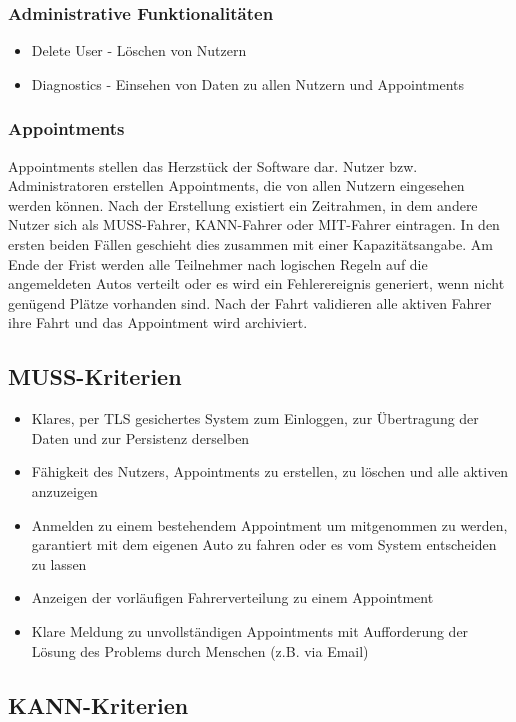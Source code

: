\documentclass[11pt,a4paper]{article}
\begin{document}
\subsubsection{Administrative Funktionalitäten}
\begin{itemize}
\item Delete User - Löschen von Nutzern
\item Diagnostics - Einsehen von Daten zu allen Nutzern und Appointments
\end{itemize}
\subsubsection{Appointments}
Appointments stellen das Herzstück der Software dar. Nutzer bzw. Administratoren erstellen Appointments, die von allen Nutzern eingesehen werden können. Nach der Erstellung existiert ein Zeitrahmen, in dem andere Nutzer sich als MUSS-Fahrer, KANN-Fahrer oder MIT-Fahrer eintragen. In den ersten beiden Fällen geschieht dies zusammen mit einer Kapazitätsangabe.
Am Ende der Frist werden alle Teilnehmer nach logischen Regeln auf die angemeldeten Autos verteilt oder es wird ein Fehlerereignis generiert, wenn nicht genügend Plätze vorhanden sind.
Nach der Fahrt validieren alle aktiven Fahrer ihre Fahrt und das Appointment wird archiviert.
\subsection{MUSS-Kriterien}
\begin{itemize}
\item Klares, per TLS gesichertes System zum Einloggen, zur Übertragung der Daten und zur Persistenz derselben
\item Fähigkeit des Nutzers, Appointments zu erstellen, zu löschen und alle aktiven anzuzeigen
\item Anmelden zu einem bestehendem Appointment um mitgenommen zu werden, garantiert mit dem eigenen Auto zu fahren oder es vom System entscheiden zu lassen
\item Anzeigen der vorläufigen Fahrerverteilung zu einem Appointment
\item Klare Meldung zu unvollständigen Appointments mit Aufforderung der Lösung des Problems durch Menschen (z.B. via Email)
\end{itemize}

\subsection{KANN-Kriterien}
\end{document}
